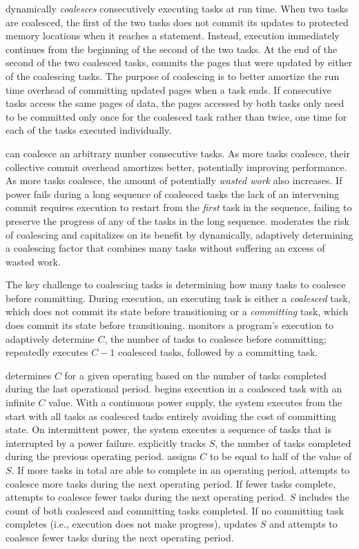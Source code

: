 \sys dynamically {\em coalesces} consecutively executing tasks at run time.
When two tasks are coalesced, the first of the two tasks does not commit its
updates to protected memory locations when it reaches a \transition statement.
Instead, execution immediately continues from the beginning of the second of
the two tasks.  At the end of the second of the two coalesced tasks, \sys
commits the pages that were updated by either of the coalescing tasks.  The
purpose of coalescing is to better amortize the run time overhead of committing
updated pages when a task ends. If consecutive tasks access the same pages of
data, the pages accessed by both tasks only need to be committed only once for
the coalesced task rather than twice, one time for each of the tasks executed
individually.  

\sys can coalesce an arbitrary number consecutive tasks.  As more tasks
coalesce, their collective commit overhead amortizes better, potentially
improving performance.  As more tasks coalesce, the amount of potentially {\em
wasted work} also increases. If power fails during a long sequence of coalesced
tasks the lack of an intervening commit requires execution to restart from the
{\em first} task in the sequence, failing to preserve the progress of any of
the tasks in the long sequence. \sys moderates the risk of coalescing and
capitalizes on its benefit by dynamically, adaptively determining a coalescing
factor that combines many tasks without suffering an excess of wasted work. 

The key challenge to coalescing tasks is determining how many tasks to coalesce
before committing.  During execution, an executing task is either a {\em
coalesced} task, which does not commit its state before transitioning or a {\em
committing} task, which does commit its state before transitioning. \sys
monitors a program's execution to adaptively determine $C$, the number of tasks
to coalesce before committing; \sys repeatedly executes $C-1$ coalesced tasks,
followed by a committing task.  

\sys determines $C$ for a given operating based on the number of tasks
completed during the last operational period.  \sys begins execution in a
coalesced task with an infinite $C$ value.  With a continuous power supply, the
system executes from the start with all tasks as coalesced tasks entirely
avoiding the cost of committing state.  On intermittent power, the system
executes a sequence of tasks that is interrupted by a power failure.  \sys
explicitly tracks $S$, the number of tasks completed during the previous
operating period.  \sys assigns $C$ to be equal to half of the value of $S$.
If more tasks in total are able to complete in an operating period, \sys
attempts to coalesce more tasks during the next operating period.  If fewer
tasks complete, \sys attempts to coalesce fewer tasks during the next operating
period. $S$ includes the count of both coalesced and committing tasks
completed.  If no committing task completes (i.e., execution does not make
progress), \sys updates $S$ and attempts to coalesce fewer tasks during the
next operating period.


